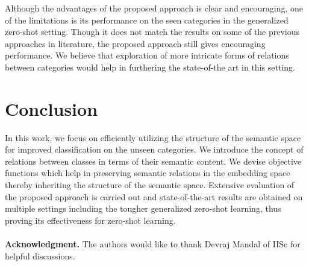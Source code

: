 \documentclass[10pt,twocolumn,letterpaper]{article}
\begin{document}
Although the advantages of the proposed approach is clear and encouraging, one of the limitations is its performance on the seen categories in the generalized zero-shot setting. Though it does not match the results on some of the previous approaches in literature, the proposed approach still gives encouraging performance. We believe that exploration of more intricate forms of relations between categories would help in furthering the state-of-the art in this setting.

\section{Conclusion}
\label{conclude}
In this work, we focus on efficiently utilizing the structure of the semantic space for improved classification on the unseen categories. 
We introduce the concept of relations between classes in terms of their semantic content. 
We devise objective functions which help in preserving semantic relations in the embedding space thereby inheriting the structure of the semantic space.
Extensive evaluation of the proposed approach is carried out and state-of-the-art results are obtained on multiple settings including the tougher generalized zero-shot learning, thus proving its effectiveness for zero-shot learning.\\\\
\textbf{Acknowledgment.} The authors would like to thank Devraj Mandal of IISc for helpful discussions.
{\small
	
	
}
\end{document}
